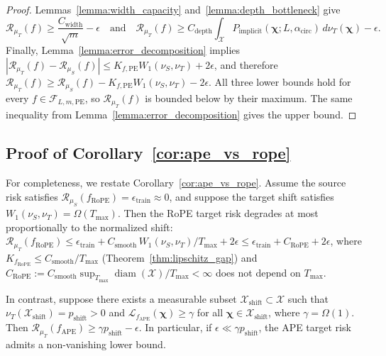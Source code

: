 \begin{proof}

Lemmas~\ref{lemma:width_capacity} and~\ref{lemma:depth_bottleneck} give
\[
\mathcal{R}_{\mu_T}(f) \ge \frac{C_{\mathrm{width}}}{\sqrt{m}}-\epsilon
\quad\text{and}\quad
\mathcal{R}_{\mu_T}(f) \ge C_{\mathrm{depth}} \int_{\mathcal{X}} P_{\mathrm{implicit}}(\boldsymbol{\chi};L,\alpha_{\mathrm{circ}}) \,d\nu_T(\boldsymbol{\chi}) -\epsilon.
\]
Finally, Lemma~\ref{lemma:error_decomposition} implies $\left| \mathcal{R}_{\mu_T}(f)-\mathcal{R}_{\mu_S}(f) \right| \le K_{f,\mathrm{PE}}W_1(\nu_S,\nu_T)+2\epsilon$, and therefore $\mathcal{R}_{\mu_T}(f) \ge \mathcal{R}_{\mu_S}(f)-K_{f,\mathrm{PE}}W_1(\nu_S,\nu_T)-2\epsilon$. All three lower bounds hold for every $f \in \mathcal{F}_{L,m,\mathrm{PE}}$, so $\mathcal{R}_{\mu_T}(f)$ is bounded below by their maximum. The same inequality from Lemma~\ref{lemma:error_decomposition} gives the upper bound.
\end{proof}

\subsection{Proof of Corollary~\ref{cor:ape_vs_rope}}
\label{app:proof-cor-ape-rope}

For completeness, we restate Corollary~\ref{cor:ape_vs_rope}.
Assume the source risk satisfies $\mathcal{R}_{\mu_S}(f_{\mathrm{RoPE}})=\epsilon_{\mathrm{train}}\approx 0$, and suppose the target shift satisfies $W_1(\nu_S,\nu_T)=\Omega(T_{\max})$. Then the RoPE target risk degrades at most proportionally to the normalized shift: $\mathcal{R}_{\mu_T}(f_{\mathrm{RoPE}}) \le \epsilon_{\mathrm{train}} + C_{\mathrm{smooth}}\,W_1(\nu_S,\nu_T)/T_{\max} + 2\epsilon \le \epsilon_{\mathrm{train}} + C_{\mathrm{RoPE}} + 2\epsilon$, where $K_{f_{\mathrm{RoPE}}}\le C_{\mathrm{smooth}}/T_{\max}$ (Theorem~\ref{thm:lipschitz_gap}) and $C_{\mathrm{RoPE}}:=C_{\mathrm{smooth}}\sup_{T_{\max}}\operatorname{diam}(\mathcal{X})/T_{\max}<\infty$ does not depend on $T_{\max}$.

In contrast, suppose there exists a measurable subset $\mathcal{X}_{\mathrm{shift}}\subset\mathcal{X}$ such that $\nu_T(\mathcal{X}_{\mathrm{shift}})=p_{\mathrm{shift}}>0$ and $\mathcal{L}_{f_{\mathrm{APE}}}(\boldsymbol{\chi})\ge \gamma$ for all $\boldsymbol{\chi}\in\mathcal{X}_{\mathrm{shift}}$, where $\gamma=\Omega(1)$. Then $\mathcal{R}_{\mu_T}(f_{\mathrm{APE}}) \ge \gamma p_{\mathrm{shift}}-\epsilon$. In particular, if $\epsilon \ll \gamma p_{\mathrm{shift}}$, the APE target risk admits a non-vanishing lower bound.

